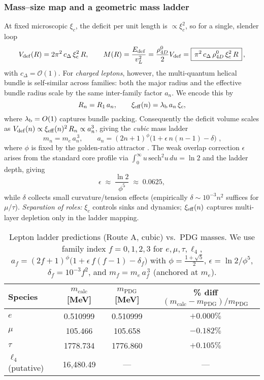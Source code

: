 \subsubsection{Mass--size map and a geometric mass ladder}
At fixed microscopic \(\xi_c\), the deficit per unit length is \( \propto \xi_c^2\), so for a single, slender loop
\begin{equation}
V_{\rm def}(R)=2\pi^2\,c_\Delta\,\xi_c^2\,R,\qquad
M(R)=\frac{E_{\rm def}}{v_L^2}=\frac{\rho_{4D}^0}{2}V_{\rm def}
=\boxed{\,\pi^2\,c_\Delta\,\rho_{4D}^0\,\xi_c^2\,R\,}\,,
\label{eq:MR}
\end{equation}
with \(c_\Delta=\mathcal O(1)\).
For \emph{charged leptons}, however, the multi-quantum helical bundle is self-similar across families: both the major radius and the effective bundle radius scale by the same inter-family factor \(a_n\). We encode this by
\[
R_n=R_1\,a_n,\qquad \xi_{\rm eff}(n)=\lambda_{\rm b}\,a_n\,\xi_c,
\]
where \(\lambda_{\rm b}=O(1)\) captures bundle packing. Consequently the deficit volume scales as
\(V_{\rm def}(n)\propto \xi_{\rm eff}(n)^2\,R_n\propto a_n^3\), giving the \emph{cubic} mass ladder
\begin{equation}
\boxed{\,m_n=m_e\,a_n^{\,3},\qquad
a_n=(2n+1)^{\phi}\Big(1+\epsilon\,n(n\!-\!1)-\delta\Big)\,}\,,
\label{eq:ladder}
\end{equation}
where \(\phi\) is fixed by the golden-ratio attractor \cite{Norris2025GoldenRatio}. The weak overlap correction \(\epsilon\) arises from the standard core profile via \(\int_0^\infty u\,\mathrm{sech}^2 u\,du=\ln 2\) and the ladder depth, giving
\[
\epsilon\;\approx\;\frac{\ln 2}{\phi^5}\;\approx\;0.0625,
\]
while \(\delta\) collects small curvature/tension effects (empirically \(\delta\sim 10^{-3}n^2\) suffices for \(\mu/\tau\)).
\emph{Separation of roles:} \(\xi_c\) controls sinks and dynamics; \(\xi_{\rm eff}(n)\) captures multi-layer depletion only in the ladder mapping.

\begin{table}[h]
\centering
\begin{tabular}{lccc}
\hline
Species & $m_{\text{calc}}$ [MeV] & $m_{\text{PDG}}$ [MeV] & \% diff $(m_{\text{calc}}-m_{\text{PDG}})/m_{\text{PDG}}$ \\
\hline
$e$         & 0.510999  & 0.510999  & $+0.000\%$ \\
$\mu$       & 105.466   & 105.658   & $-0.182\%$ \\
$\tau$      & 1778.734  & 1776.860  & $+0.105\%$ \\
$\ell_4$ (putative) & 16{,}480.49 & ---       & --- \\
\hline
\end{tabular}
\caption{Lepton ladder predictions (Route A, cubic) vs.\ PDG masses.
We use family index $f=0,1,2,3$ for $e,\mu,\tau,\ell_4$,
$a_f=(2f+1)^{\phi}\big(1+\epsilon\,f(f-1)-\delta_f\big)$ with
$\phi=\tfrac{1+\sqrt5}{2}$, $\epsilon=\ln 2/\phi^5$, $\delta_f=10^{-3}f^2$,
and $m_f=m_e\,a_f^{\,3}$ (anchored at $m_e$).}
\label{tab:lepton_ladder_vs_pdg}
\end{table}


